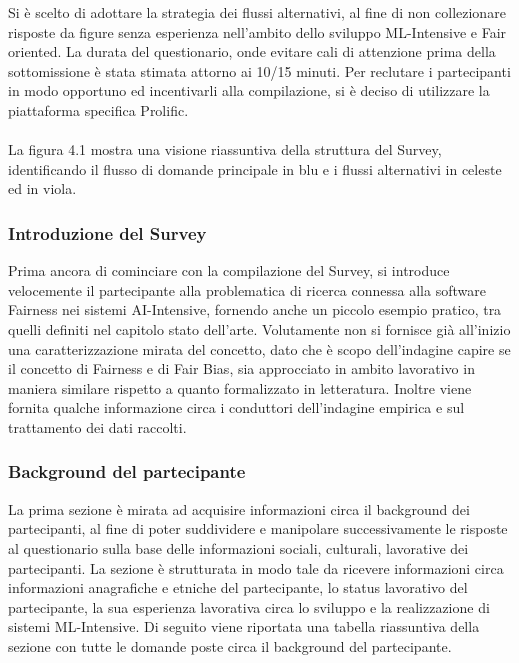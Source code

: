     Si è scelto di adottare la strategia dei flussi alternativi, al fine di non collezionare risposte da figure senza esperienza nell'ambito dello sviluppo ML-Intensive e Fair oriented. La durata del questionario, onde evitare cali di attenzione prima della sottomissione è stata stimata attorno ai 10/15 minuti. Per reclutare i partecipanti in modo opportuno ed incentivarli alla compilazione, si è deciso di utilizzare la piattaforma specifica Prolific.\\ \\
    
    La figura 4.1 mostra una visione riassuntiva della struttura del Survey, identificando il flusso di domande principale in blu e i flussi alternativi in celeste ed in viola. 
    
   \subsubsection{Introduzione del Survey}
   Prima ancora di cominciare con la  compilazione del Survey, si introduce velocemente il partecipante alla problematica di ricerca connessa alla software Fairness nei sistemi AI-Intensive, fornendo anche un piccolo esempio pratico, tra quelli definiti nel capitolo stato dell'arte. Volutamente non si fornisce già all'inizio una caratterizzazione mirata del concetto, dato che è scopo dell'indagine capire se il concetto di Fairness e di Fair Bias, sia approcciato in ambito lavorativo in maniera similare rispetto a quanto formalizzato in letteratura. Inoltre viene fornita qualche informazione circa i conduttori dell'indagine empirica e sul trattamento dei dati raccolti. 
   
   
   
   \subsubsection{Background del partecipante}
   La prima sezione è mirata ad acquisire informazioni circa il background dei partecipanti, al fine di poter suddividere e manipolare successivamente le risposte al questionario sulla base delle informazioni sociali, culturali, lavorative dei partecipanti. La sezione è strutturata in modo tale da ricevere informazioni circa informazioni anagrafiche e etniche del partecipante, lo status lavorativo del partecipante, la sua esperienza lavorativa circa lo sviluppo e la realizzazione di sistemi ML-Intensive. Di seguito viene riportata una tabella riassuntiva della sezione con tutte le domande poste circa il background del partecipante.\\
   
